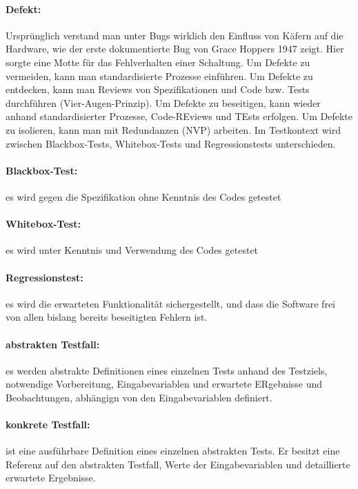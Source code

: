 \paragraph{Defekt:}

Ursprünglich verstand man unter Bugs wirklich den Einfluss von Käfern auf die Hardware, wie der erste dokumentierte Bug von Grace Hoppers 1947 zeigt. Hier sorgte eine Motte für das Fehlverhalten einer Schaltung.
\linebreak
Um Defekte zu vermeiden, kann man standardisierte Prozesse einführen.
Um Defekte zu entdecken, kann man Reviews von Spezifikationen und Code bzw. Tests durchführen (Vier-Augen-Prinzip).
Um Defekte zu beseitigen, kann wieder anhand standardisierter Prozesse, Code-REviews und TEsts erfolgen.
Um Defekte zu isolieren, kann man mit Redundanzen (NVP) arbeiten. 
\linebreak
Im Testkontext wird zwischen Blackbox-Tests, Whitebox-Tests und Regressionstests unterschieden. 

\paragraph{Blackbox-Test:} es wird gegen die Spezifikation ohne Kenntnis des Codes getestet
\paragraph{Whitebox-Test:} es wird unter Kenntnis und Verwendung des Codes getestet
\paragraph{Regressionstest:} es wird die erwarteten Funktionalität sichergestellt, und dass die Software frei von allen bislang bereits beseitigten Fehlern ist.
\linebreak
\paragraph{abstrakten Testfall:} es werden abstrakte Definitionen eines einzelnen Tests anhand des Testziels, notwendige Vorbereitung, Eingabevariablen und erwartete ERgebnisse und Beobachtungen, abhängign von den Eingabevariablen definiert.
\paragraph{konkrete Testfall:} ist eine ausführbare Definition eines einzelnen abstrakten Tests. Er besitzt eine Referenz auf den abstrakten Testfall, Werte der Eingabevariablen und detaillierte erwartete Ergebnisse.
